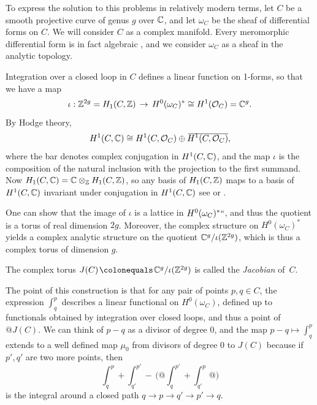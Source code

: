 To express the solution to this problems in relatively modern terms,
let $C$ be a smooth projective curve of genus $g$ over ${\mathbb C}$, and let
$\omega_{C}$ be the sheaf of differential forms on $C$. We will
consider $C$ as a 
complex manifold.
%
%
Every meromorphic differential form is in fact algebraic
\cite{SerreGAGA}, and we consider $\omega_{C}$ as a sheaf in the analytic topology.

Integration 
%
over a closed loop in $C$ defines a linear function on 1-forms, so that we have a map
$$
\iota: \ZZ^{2g} = H_1(C,\ZZ) \; \to \;  H^0(\omega_C)^* \cong H^1(\sO_C) = \CC^{g}.
$$
By Hodge theory, 
% 
$$
H^1(C, \CC) \cong H^1(C, \cO_C) \oplus \overkern20{H^1(C, \cO_C)}
,
$$
where the bar denotes complex conjugation in $H^1(C, {\mathbb C})$, and the map $\iota$ is the composition of 
 the natural inclusion with the projection to the first summand.
 Now
$H_1(C,{\mathbb C}) = {\mathbb C}\otimes_{\mathbb Z} H_1(C,{\mathbb Z})$, so any basis of $H_1(C,{\mathbb Z})$ maps to a basis of 
$H^1(C, {\mathbb C})$ invariant under conjugation in $H^1(C, {\mathbb C})$\emdash 
see \cite{Voisin} or \cite[p.\,116]{Griffiths-Harris1978}. 

One can show that the image of $\iota$ is a 
%
lattice in $H^0(\omega_C)^*` `$, and thus the quotient
is a torus of real dimension $2g$. 
Moreover, the
complex structure on $H^0(\omega_C)^*$ yields a complex analytic structure on the quotient ${\mathbb C}^{g}/\iota({\mathbb Z}^{2g})$, which is thus a complex torus of  dimension $g$.  
%

\begin{definition}
\hskip-3pt
The complex torus $J(C) \,{\colonequals}\, \CC^{g}/\iota(\ZZ^{2g})$ 
%
%
is called the \emph{Jacobian} of~$C$.%
\unif
\end{definition}

The point of this construction is that for any pair of points $p, q
\in C$, the expression $\int_q^p$ describes a linear functional on
$H^0(\omega_C)$, defined up to functionals obtained by integration
over closed loops, and thus a point of $@J(C)$. We can think of $p-q$
as a divisor of 
degree 0, and the map $p-q \mapsto \int_q^p$ extends to a well defined map $\mu_0$ from divisors of degree 0 to $J(C)$ because if $p',q'$ are two more points, then
{\meshing
$$
\int_q^p +\int_{q'}^{p'} \! - \,\biggl(@\int_q^{p'} +\int_{q'}^p@\biggr) 
$$}%
is the integral around a closed path $q\to p\to q'\to p' \to q$.

